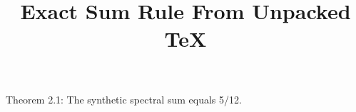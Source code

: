 \documentclass{article}
\title{Exact Sum Rule From Unpacked TeX}
\begin{document}
Theorem 2.1: The synthetic spectral sum equals 5/12.
\end{document}
